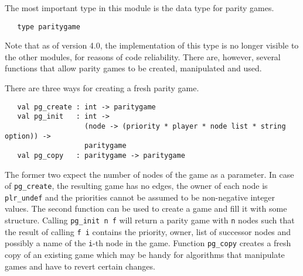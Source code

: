The most important type in this module is the data type for parity games.
\begin{verbatim}
   type paritygame
\end{verbatim}
Note that as of version 4.0, the implementation of this type is no longer visible to the other modules, for reasons of code reliability. There are,
however, several functions that allow parity games to be created, manipulated and used.

There are three ways for creating a fresh parity game. 
\begin{verbatim}
   val pg_create : int -> paritygame
   val pg_init   : int -> 
                   (node -> (priority * player * node list * string option)) -> 
                   paritygame
   val pg_copy   : paritygame -> paritygame
\end{verbatim}
The former two expect the number of nodes of the game as a parameter. In case of \verb#pg_create#, the resulting game has no edges, the owner of each node
is \verb#plr_undef# and the priorities cannot be assumed to be non-negative integer values. The second function can be used to create a game and
fill it with some structure. Calling \verb#pg_init n f# will return a parity game with \verb#n# nodes such that the result of calling \verb#f i#
contains the priority, owner, list of successor nodes and possibly a name of the \verb#i#-th node in the game. Function \verb#pg_copy# creates a fresh
copy of an existing game which may be handy for algorithms that manipulate games and have to revert certain changes.

